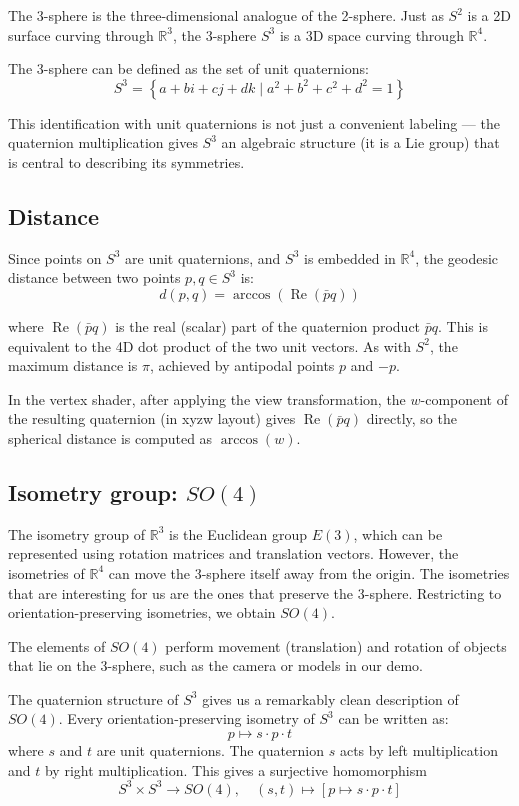 \documentclass[twocolumn,10pt]{article}
\begin{document}
The 3-sphere is the three-dimensional analogue of the 2-sphere. Just as $S^2$ is a 2D surface curving through $\mathbb{R}^3$, the 3-sphere $S^3$ is a 3D space curving through $\mathbb{R}^4$.

The 3-sphere can be defined as the set of unit quaternions:
\[
    S^3 = \left\{ a + bi + cj + dk \mid a^2 + b^2 + c^2 + d^2 = 1 \right\}
\]

This identification with unit quaternions is not just a convenient labeling --- the quaternion multiplication gives $S^3$ an algebraic structure (it is a Lie group) that is central to describing its symmetries.

\subsection{Distance}

Since points on $S^3$ are unit quaternions, and $S^3$ is embedded in $\mathbb{R}^4$, the geodesic distance between two points $p, q \in S^3$ is:
\[
    d(p, q) = \arccos(\operatorname{Re}(\bar{p} q))
\]

where $\operatorname{Re}(\bar{p}q)$ is the real (scalar) part of the quaternion product $\bar{p}q$. This is equivalent to the 4D dot product of the two unit vectors. As with $S^2$, the maximum distance is $\pi$, achieved by antipodal points $p$ and $-p$.

In the vertex shader, after applying the view transformation, the $w$-component of the resulting quaternion (in xyzw layout) gives $\operatorname{Re}(\bar{p}q)$ directly, so the spherical distance is computed as $\arccos(w)$.

\subsection{Isometry group: $SO(4)$}

The isometry group of $\mathbb{R}^3$ is the Euclidean group $E(3)$, which can be represented using rotation matrices and translation vectors. However, the isometries of $\mathbb{R}^4$ can move the 3-sphere itself away from the origin. The isometries that are interesting for us are the ones that preserve the 3-sphere. Restricting to orientation-preserving isometries, we obtain $SO(4)$.

The elements of $SO(4)$ perform movement (translation) and rotation of objects that lie on the 3-sphere, such as the camera or models in our demo.

The quaternion structure of $S^3$ gives us a remarkably clean description of $SO(4)$. Every orientation-preserving isometry of $S^3$ can be written as:
\[
    p \mapsto s \cdot p \cdot t
\]
where $s$ and $t$ are unit quaternions. The quaternion $s$ acts by left multiplication and $t$ by right multiplication. This gives a surjective homomorphism
\[
    S^3 \times S^3 \to SO(4), \quad (s, t) \mapsto [p \mapsto s \cdot p \cdot t]
\]
\end{document}
